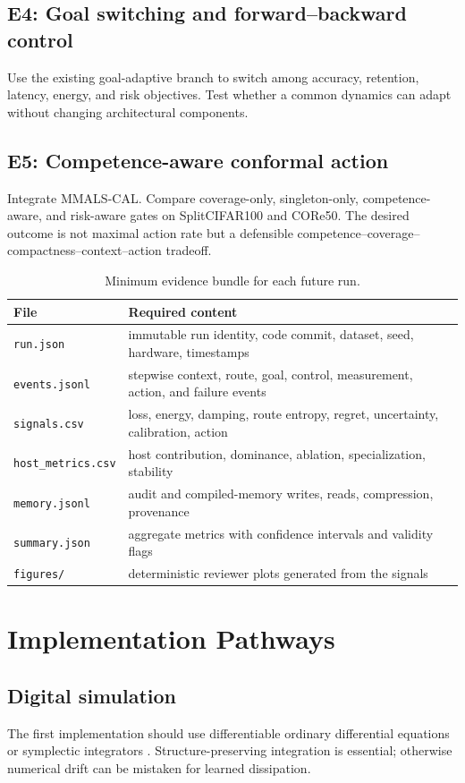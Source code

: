 \documentclass[11pt]{article}
\theoremstyle{definition}\newtheorem{definition}{Definition}\newtheorem{assumption}{Assumption}
\theoremstyle{remark}\newtheorem{remark}{Remark}
\begin{document}
\subsection{E4: Goal switching and forward--backward control}
Use the existing goal-adaptive branch to switch among accuracy, retention, latency, energy, and risk objectives. Test whether a common dynamics can adapt without changing architectural components.

\subsection{E5: Competence-aware conformal action}
Integrate MMALS-CAL. Compare coverage-only, singleton-only, competence-aware, and risk-aware gates on SplitCIFAR100 and CORe50. The desired outcome is not maximal action rate but a defensible competence--coverage--compactness--context--action tradeoff.

\begin{table}[ht]
\centering
\caption{Minimum evidence bundle for each future run.}
\small
\begin{tabularx}{\textwidth}{p{}X}
\toprule
File & Required content\\
\midrule
\texttt{run.json} & immutable run identity, code commit, dataset, seed, hardware, timestamps\\
\texttt{events.jsonl} & stepwise context, route, goal, control, measurement, action, and failure events\\
\texttt{signals.csv} & loss, energy, damping, route entropy, regret, uncertainty, calibration, action\\
\texttt{host\_metrics.csv} & host contribution, dominance, ablation, specialization, stability\\
\texttt{memory.jsonl} & audit and compiled-memory writes, reads, compression, provenance\\
\texttt{summary.json} & aggregate metrics with confidence intervals and validity flags\\
\texttt{figures/} & deterministic reviewer plots generated from the signals\\
\bottomrule
\end{tabularx}
\end{table}

\section{Implementation Pathways}
\subsection{Digital simulation}
The first implementation should use differentiable ordinary differential equations or symplectic integrators \cite{Hairer2006,Greydanus2019}. Structure-preserving integration is essential; otherwise numerical drift can be mistaken for learned dissipation.
\end{document}
